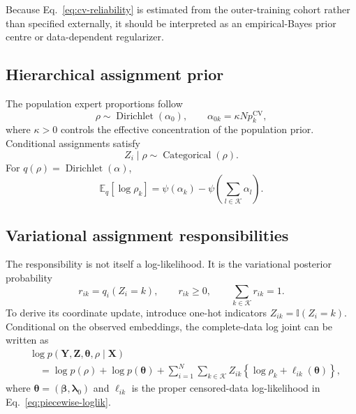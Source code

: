 Because Eq.~\eqref{eq:cv-reliability} is estimated from the outer-training
cohort rather than specified externally, it should be interpreted as an
empirical-Bayes prior centre or data-dependent regularizer.

\subsection{Hierarchical assignment prior}

The population expert proportions follow
\begin{equation}
    \rho\sim\operatorname{Dirichlet}(\alpha_0),
    \qquad
    \alpha_{0k}=\kappa N p_k^{\mathrm{CV}},
\label{eq:dirichlet-prior}
\end{equation}
where $\kappa>0$ controls the effective concentration of the population prior.
Conditional assignments satisfy
\begin{equation}
    Z_i\mid\rho\sim\operatorname{Categorical}(\rho).
\end{equation}
For $q(\rho)=\operatorname{Dirichlet}(\alpha)$,
\begin{equation}
    \mathbb E_q[\log\rho_k]
    =\psi(\alpha_k)-\psi\!\left(\sum_{l\in\mathcal K}\alpha_l\right).
\label{eq:expected-log-rho}
\end{equation}

\subsection{Variational assignment responsibilities}
\label{sec:responsibility-derivation}

The responsibility is not itself a log-likelihood. It is the variational
posterior probability
\begin{equation}
    r_{ik}=q_i(Z_i=k),\qquad r_{ik}\geq0,\qquad
    \sum_{k\in\mathcal K}r_{ik}=1.
\end{equation}
To derive its coordinate update, introduce one-hot indicators
$Z_{ik}=\mathbb{I}(Z_i=k)$. Conditional on the observed embeddings, the
complete-data log joint can be written as
\begin{align}
&\log p(\boldsymbol Y,\boldsymbol Z,\boldsymbol\theta,\rho
        \mid\boldsymbol X) \nonumber\\
&\quad=\log p(\rho)+\log p(\boldsymbol\theta)
 +\sum_{i=1}^{N}\sum_{k\in\mathcal K}Z_{ik}
   \left\{\log\rho_k+\ell_{ik}(\boldsymbol\theta)\right\},
\label{eq:complete-log-joint}
\end{align}
where $\boldsymbol\theta=(\boldsymbol\beta,\boldsymbol\lambda_0)$ and
$\ell_{ik}$ is the proper censored-data log-likelihood in
Eq.~\eqref{eq:piecewise-loglik}.


